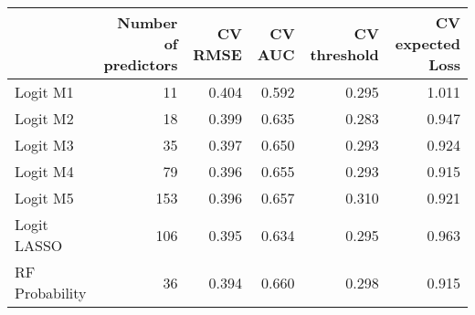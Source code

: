 
\begin{tabular}{lrrrrr}
\toprule
  & Number of predictors & CV RMSE & CV AUC & CV threshold & CV expected Loss\\
\midrule
Logit M1 & 11 & 0.404 & 0.592 & 0.295 & 1.011\\
Logit M2 & 18 & 0.399 & 0.635 & 0.283 & 0.947\\
Logit M3 & 35 & 0.397 & 0.650 & 0.293 & 0.924\\
Logit M4 & 79 & 0.396 & 0.655 & 0.293 & 0.915\\
Logit M5 & 153 & 0.396 & 0.657 & 0.310 & 0.921\\
Logit LASSO & 106 & 0.395 & 0.634 & 0.295 & 0.963\\
RF Probability & 36 & 0.394 & 0.660 & 0.298 & 0.915\\
\bottomrule
\end{tabular}
